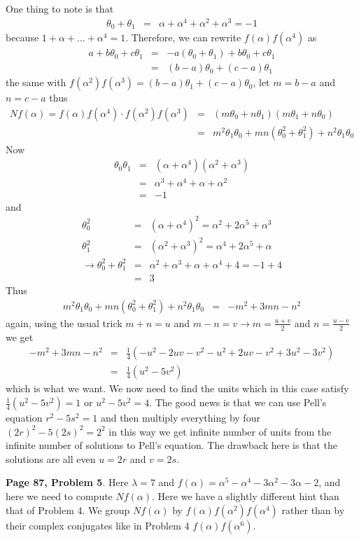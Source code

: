 \documentclass[aps,preprint,preprintnumbers,nofootinbib,showpacs,prd]{revtex4-1}
\newcommand{\nbea}{\begin{eqnarray*}}
\newcommand{\neea}{\end{eqnarray*}}
\begin{document}
One thing to note is that
%
\nbea
\theta_0 + \theta_1 & = & \alpha + \alpha^4 + \alpha^2 + \alpha^3 = -1
\neea
%
because $1 + \alpha + \dots + \alpha^4 = 1$. Therefore, we can rewrite $f(\alpha)f(\alpha^4)$ as
%
\nbea
a + b\theta_0 + c\theta_1 & = & -a(\theta_0 + \theta_1) + b\theta_0 + c\theta_1 \\
& = & (b-a)\theta_0 + (c-a)\theta_1
\neea
%
the same with $f(\alpha^2)f(\alpha^3) = (b-a)\theta_1 + (c-a)\theta_0$, let $m = b-a$ and $n = c-a$ thus
%
\nbea
Nf(\alpha) = f(\alpha)f(\alpha^4) \cdot f(\alpha^2)f(\alpha^3) & = & (m\theta_0 + n\theta_1)(m\theta_1 + n\theta_0) \\
& = & m^2 \theta_1\theta_0 + mn(\theta_0^2 + \theta_1^2) + n^2 \theta_1\theta_0
\neea
%
Now
%
\nbea
\theta_0\theta_1 & = & (\alpha + \alpha^4)(\alpha^2 + \alpha^3) \\
& = & \alpha^3 + \alpha^4 + \alpha + \alpha^2 \\
& = & -1
\neea
%
and
%
\nbea
\theta_0^2 & = & (\alpha + \alpha^4)^2 = \alpha^2 + 2\alpha^5 + \alpha^3 \\
\theta_1^2 & = & (\alpha^2 + \alpha^3)^2 = \alpha^4 + 2\alpha^5 + \alpha \\
\to \theta_0^2 + \theta_1^2 & = & \alpha^2 + \alpha^3 + \alpha + \alpha^4 + 4 = -1 + 4 \\
& = & 3
\neea
%
Thus
%
\nbea
m^2 \theta_1\theta_0 + mn(\theta_0^2 + \theta_1^2) + n^2 \theta_1\theta_0 & = & -m^2 + 3mn - n^2
\neea
%
again, using the usual trick $m + n = u$ and $m - n = v \to m = \frac{u + v}{2}$ and $n = \frac{u - v}{2}$ we get
%
\nbea
-m^2 + 3mn - n^2 & = & \frac{1}{4}(-u^2 - 2uv - v^2 - u^2 + 2uv - v^2 + 3u^2 - 3v^2) \\
& = & \frac{1}{4}(u^2 - 5v^2)
\neea
%
which is what we want. We now need to find the units which in this case satisfy $\frac{1}{4}(u^2 - 5v^2) = 1$ or $u^2 - 5v^2 = 4$. The good news is that we can use Pell's equation $r^2 - 5s^2 = 1$ and then multiply everything by four $(2r)^2 - 5(2s)^2 = 2^2$ in this way we get infinite number of units from the infinite number of solutions to Pell's equation. The drawback here is that the solutions are all even $u = 2r$ and $v = 2s$.

{\bf Page 87, Problem 5}. Here $\lambda = 7$ and $f(\alpha) = \alpha^5 - \alpha^4 - 3\alpha^2 - 3\alpha - 2$, and here we need to compute $Nf(\alpha)$. Here we have a slightly different hint than that of Problem 4. We group $Nf(\alpha)$ by $f(\alpha)f(\alpha^2)f(\alpha^4)$ rather than by their complex conjugates like in Problem 4 $f(\alpha)f(\alpha^6)$.
\end{document}
